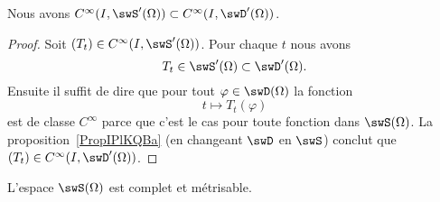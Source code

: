 \begin{lemma}
	Nous avons \(  C^{\infty}(I,\swS'(\Omega))\subset C^{\infty}(I,\swD'(\Omega))\).
\end{lemma}

\begin{proof}
	Soit \( (T_t)\in C^{\infty}(I,\swS'(\Omega))\). Pour chaque \( t\) nous avons
	\begin{equation}
		T_t\in\swS'(\Omega)\subset\swD'(\Omega).
	\end{equation}
	Ensuite il suffit de dire que pour tout \( \varphi\in\swD(\Omega)\) la fonction
	\begin{equation}
		t\mapsto T_t(\varphi)
	\end{equation}
	est de classe \(  C^{\infty}\) parce que c'est le cas pour toute fonction dans \( \swS(\Omega)\). La proposition~\ref{PropIPlKQBa} (en changeant \( \swD\) en \( \swS\)) conclut que \( (T_t)\in C^{\infty}(I,\swD'(\Omega))\).
\end{proof}

\begin{proposition} \label{PropIIAcyDq}
	L'espace \( \swS(\Omega)\) est complet et métrisable.
\end{proposition}

